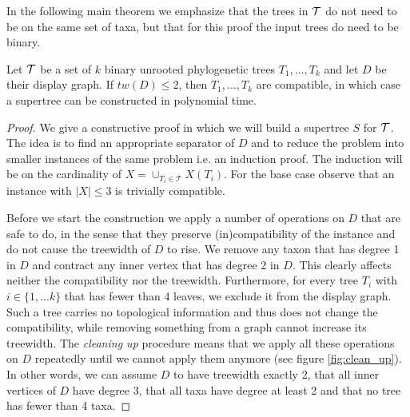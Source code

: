 In the following main theorem we emphasize that the trees in ${\mathcal T}$ do not need to be on the same set of taxa, but that for this proof the input trees do need to be binary.


\begin{theorem} \label{ktrees}
 Let ${\mathcal T}$ be a set of $k$ binary unrooted phylogenetic trees $T_1, ..., T_k$ and let $D$ be their display graph. If
$tw(D) \leq 2$, then $T_1, ..., T_k$ are compatible, in which case a supertree can be constructed in polynomial time.
\end{theorem}

\begin{proof}

We give a constructive proof in which we will build a supertree $S$ for ${\mathcal T}$. The idea is to find an appropriate separator of $D$ and to reduce the problem into smaller instances of the same problem i.e. an induction proof. The
induction will be on the cardinality of $X = \cup_{T_i \in \mathcal{T}} X(T_i)$. For the base case observe that
an instance with $|X| \leq 3$ is trivially compatible. 


Before we start the construction we apply a number of operations on $D$ that are safe to do, in the sense that they preserve (in)compatibility of the instance and do not cause the treewidth of $D$ to rise. We remove any taxon that has degree 1 in $D$ and contract any inner vertex that has degree 2 in $D$. This clearly affects neither the compatibility nor the treewidth. Furthermore, for every tree $T_i$ with $i \in \{1,...k\}$ that has fewer than 4 leaves, we exclude it from the display graph. Such a tree carries no topological information and thus does not change the compatibility, while removing something from a graph cannot increase its treewidth. The \emph{cleaning up} procedure means that we apply all these operations on $D$ repeatedly until we cannot apply them anymore (see figure \ref{fig:clean_up}). In other words, we can assume $D$ to have treewidth exactly 2, that all inner vertices of $D$ have degree 3, that all taxa have degree at least 2 and that no tree has fewer than 4 taxa.


\end{proof}
